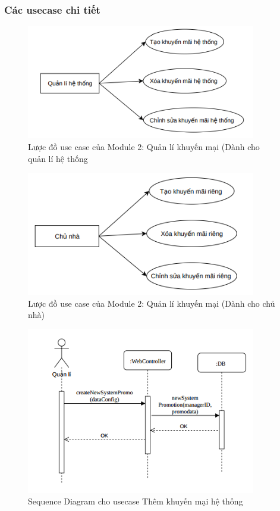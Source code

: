 \subsubsection{Các usecase chi tiết}
\begin{figure}[!h]
	\centering
	\includegraphics[width=10cm]{Image/module2aa.png}
	\vspace{0.5cm}
	\caption{Lược đồ use case của Module 2: Quản lí khuyến mại (Dành cho quản lí hệ thống}
\end{figure}
\begin{figure}[!h]
	\centering
	\includegraphics[width=10cm]{Image/module2b.png}
	\vspace{0.5cm}
	\caption{Lược đồ use case của Module 2: Quản lí khuyến mại (Dành cho chủ nhà)}
\end{figure}
\newpage 
{}
\begin{figure}[!h]
	\centering
	\includegraphics[width=10cm]{Image/createSystemPromoSequence.png}
	\caption{Sequence Diagram cho usecase Thêm khuyến mại hệ thống}
\end{figure}
